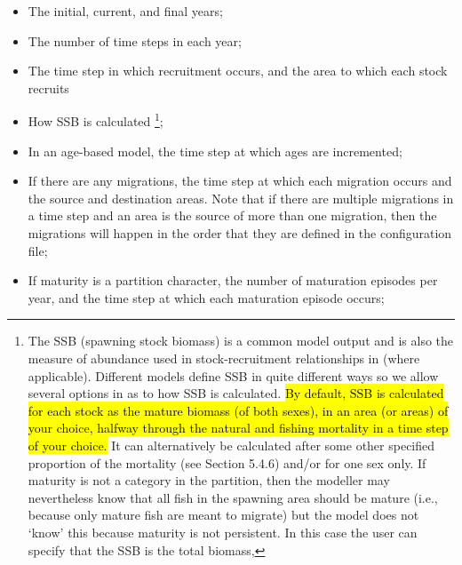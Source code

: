 \begin{itemize}
\item	The initial, current, and final years;
\item	The number of time steps in each year;
\item	The time step in which recruitment occurs, and the area to which each stock recruits
\item	How SSB is calculated \footnote{The SSB (spawning stock biomass) is a common model output and is also the measure of abundance used in stock-recruitment relationships in \CNAME (where applicable). Different models define SSB in quite different ways so we allow several options in \CNAME as to how SSB is calculated. \hl{By default, SSB is calculated for each stock as the mature biomass (of both sexes), in an area (or areas) of your choice, halfway through the natural and fishing mortality in a time step of your choice.} It can alternatively be calculated after some other specified proportion of the mortality (see Section 5.4.6) and/or for one sex only.  If maturity is not a category in the partition, then the modeller may nevertheless know that all fish in the spawning area should be mature (i.e., because only mature fish are meant to migrate) but the model does not ‘know’ this because maturity is not persistent. In this case the user can specify that the SSB is the total biomass,};
\item	In an age-based model, the time step at which ages are incremented;
\item	If there are any migrations, the time step at which each migration occurs and the source and destination areas. Note that if there are multiple migrations in a time step and an area is the source of more than one migration, then the migrations will happen in the order that they are defined in the configuration file;
\item	If maturity is a partition character, the number of maturation episodes per year, and the time step at which each maturation episode occurs;

\end{itemize}
